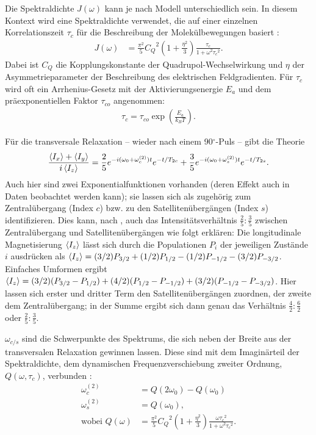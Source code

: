 Die Spektraldichte $J(\omega)$ kann je nach Modell unterschiedlich sein. In diesem Kontext wird eine Spektraldichte verwendet, die auf einer einzelnen Korrelationszeit $\tau_c$ für die Beschreibung der Molekülbewegungen basiert \cite{eckert}:
\begin{align}
    J(\omega) &= \frac{\pi^2}{5} {C_Q}^2 \left( 1 + \frac{\eta^2}{3} \right) \frac{\tau_c}{1 + \omega^2 {\tau_c}^2}. \label{eqn:spektraldichte_j}
\end{align}
Dabei ist $C_Q$ die Kopplungskonstante der Quadrupol-Wechselwirkung und $\eta$ der Asymmetrieparameter der Beschreibung des elektrischen Feldgradienten. Für $\tau_c$ wird oft ein Arrhenius-Gesetz mit der Aktivierungsenergie $E_a$ und dem präexponentiellen Faktor $\tau_{co}$ angenommen:
\begin{align}
    \tau_c = \tau_{co} \exp \left( \frac{E_a}{k_B T} \right).
\end{align}


Für die transversale Relaxation -- wieder nach einem 90$^\circ$-Puls -- gibt die Theorie \cite{werbelow}
\begin{align}
    \frac{\Braket{I_x} + \Braket{I_y}}{i\Braket{I_z}} = \frac{2}{5}e^{-i(\omega_0 + \omega_c^{(2)})t}e^{-t/T_{2c}} + \frac{3}{5}e^{-i(\omega_0 + \omega_s^{(2)})t}e^{-t/T_{2s}}. \label{eqn:trans_relax}
\end{align}
Auch hier sind zwei Exponentialfunktionen vorhanden (deren Effekt auch in Daten beobachtet werden kann); sie lassen sich als zugehörig zum Zentralübergang (Index $c$) bzw. zu den Satellitenübergängen (Index $s$) identifizieren. Dies kann, nach \cite{werbelow}, auch das Intensitätsverhältnis $\frac{2}{5}:\frac{3}{5}$ zwischen Zentralübergang und Satellitenübergängen wie folgt erklären: Die longitudinale Magnetisierung $\Braket{I_z}$ lässt sich durch die Populationen $P_i$ der jeweiligen Zustände $i$ ausdrücken als $\Braket{I_z} = (3/2)P_{3/2} + (1/2)P_{1/2} - (1/2)P_{-1/2} - (3/2)P_{-3/2}$. Einfaches Umformen ergibt $\Braket{I_z} = (3/2)(P_{3/2} - P_{1/2}) + (4/2)(P_{1/2} - P_{-1/2}) + (3/2)(P_{-1/2} - P_{-3/2})$. Hier lassen sich erster und dritter Term den Satellitenübergängen zuordnen, der zweite dem Zentralübergang; in der Summe ergibt sich dann genau das Verhältnis $\frac{4}{2}:\frac{6}{2}$ oder $\frac{2}{5}:\frac{3}{5}$.

$\omega_{c/s}$ sind die Schwerpunkte des Spektrums, die sich neben der Breite aus der transversalen Relaxation gewinnen lassen. Diese sind mit dem Imaginärteil der Spektraldichte, dem dynamischen Frequenzverschiebung zweiter Ordnung, $Q(\omega, \tau_c)$, verbunden \cite{eckert}:
\begin{align}
    \omega_c^{(2)} &= Q(2\omega_0) - Q(\omega_0) \\ \label{eqn:schwerpunkt}
    \omega_s^{(2)} &= Q(\omega_0), \\
    \text{wobei } Q(\omega) &= \frac{\pi^2}{5} {C_Q}^2 \left( 1 + \frac{\eta^2}{3} \right) \frac{\omega {\tau_c}^2}{1 + \omega^2 {\tau_c}^2}.
\end{align}

